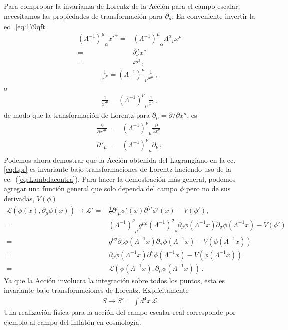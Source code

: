 Para comprobar la invarianza de Lorentz de la Acción para el campo escalar, necesitamos las propiedades de transformación para $\partial_\mu$. En conveniente invertir la ec.~\eqref{eq:179qft}
\begin{align}
  {\left(\Lambda^{-1}\right)^\mu}_\alpha{x'}^\alpha=&{\left(\Lambda^{-1}\right)^\mu}_\alpha{\Lambda^\alpha}_\nu x^\nu\nonumber\\
=&\delta^\mu_\nu x^\nu\nonumber\\
=&x^\mu\,,
\end{align}
\begin{align}
  \frac{1}{{x'}^\nu}= {\left(\Lambda^{-1}\right)^\mu}_\nu\frac{1}{x^\mu}\,,
\end{align}
o
\begin{align}
  \label{eq:183qft}
    \frac{1}{{x'}^\mu}= {\left(\Lambda^{-1}\right)^\nu}_\mu\frac{1}{x^\nu}\,,
\end{align}
de modo que la transformación de Lorentz para $\partial_\mu=\partial/\partial x^\mu$, es
\begin{align}
  \label{dmulrtran}
   \frac{\partial}{{\partial x'}^\mu}=& {\left(\Lambda^{-1}\right)^\nu}_\mu\frac{\partial}{\partial x^\nu}\nonumber\\
   {\partial\,}'_\mu=& {\left(\Lambda^{-1}\right)^\nu}_\mu\partial_\nu\,,
\end{align}
Podemos ahora demostrar que la Acción obtenida del Lagrangiano en la ec.\eqref{eq:Lpr} es invariante bajo transformaciones de Lorentz haciendo uso de la ec.~(\ref{eq:Lambdacontra}). Para hacer la demostración más general, podemos agregar una función general que solo dependa del campo $\phi$ pero no de sus derivadas, $V(\phi)$
\begin{align}
  \mathcal{L}(\phi(x),\partial_{\mu}\phi(x))\to  \mathcal{L}'=& \frac{1}{2}\partial'_\mu\phi'(x)\partial^{'\mu}\phi'(x)-V(\phi'), \nonumber\\
  =&{\left(\Lambda^{-1}\right)^\nu}_\mu g^{\mu \rho}{\left(\Lambda^{-1}\right)^\sigma}_\rho \partial_\nu\phi(\Lambda^{-1}x) \partial_\sigma \phi(\Lambda^{-1}x) -V(\phi')\nonumber\\
  =& g^{\nu \sigma}\partial_\nu\phi(\Lambda^{-1}x) \partial_\sigma \phi(\Lambda^{-1}x) -V(\phi(\Lambda^{-1}x))\nonumber\\
  =& \partial_\nu\phi(\Lambda^{-1}x) \partial^{\nu} \phi(\Lambda^{-1}x) -V(\phi(\Lambda^{-1}x)) \nonumber\\
  =&\mathcal{L}(\phi(\Lambda^{-1}x),\partial_{\mu}\phi(\Lambda^{-1}x))\,.
\end{align}
Ya que la Acción involucra la integración sobre todos los puntos, esta es invariante bajo transformaciones de Lorentz. Explícitamente
\begin{align}
  S\to S'=\int d^4x\, \mathcal{L}
\end{align}
Una realización física para la acción del campo escalar real corresponde por ejemplo al campo del inflatón en cosmología.

